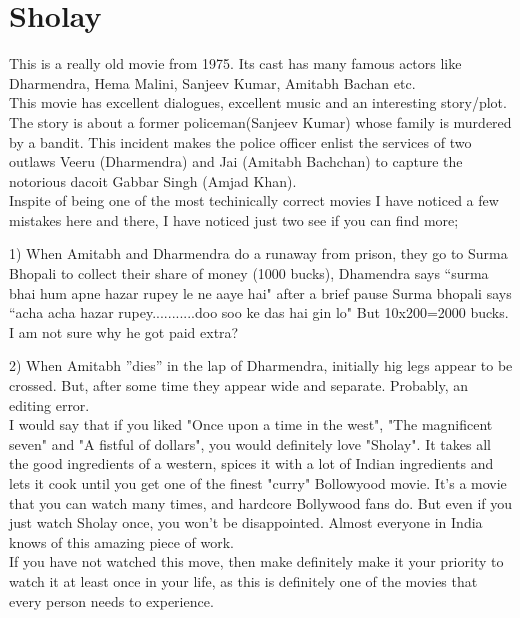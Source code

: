 \documentclass{article}
\author{Varun Khare, GSSS Rao}
\date{March 2017 }
\begin{document}
\maketitle
\section{Sholay}
This is a really old movie from 1975. Its cast has many famous actors like Dharmendra, Hema Malini, Sanjeev Kumar, Amitabh Bachan etc.
\\
This movie has excellent dialogues, excellent music and an interesting story/plot. The story is about a former policeman(Sanjeev Kumar) whose family is murdered by a bandit. This incident makes the police officer enlist the services of two outlaws Veeru (Dharmendra) and Jai (Amitabh Bachchan) to capture the notorious dacoit Gabbar Singh (Amjad Khan).
\\
Inspite of being one of the most techinically correct movies I have noticed a few mistakes here and there, I have noticed just two see if you can find more;

1) When Amitabh and Dharmendra do a runaway from prison, they go to Surma Bhopali to collect their share of money (1000 bucks), Dhamendra says ``surma bhai hum apne hazar rupey le ne aaye hai" after a brief pause Surma bhopali says ``acha acha hazar rupey...........doo soo ke das hai gin lo" But 10x200=2000 bucks. I am not sure why he got paid extra?

2) When Amitabh ''dies'' in the lap of Dharmendra, initially hig legs appear to be crossed. But, after some time they appear wide and separate. Probably, an editing error.
\\
I would say that if you liked "Once upon a time in the west", "The magnificent seven" and "A fistful of dollars", you would definitely love "Sholay". It takes all the good ingredients of a western, spices it with a lot of Indian ingredients and lets it cook until you get one of the finest "curry" Bollowyood movie. 
It's a movie that you can watch many times, and hardcore Bollywood fans do. But even if you just watch Sholay once, you won't be disappointed. Almost everyone in India knows of this amazing piece of work. 
\\
If you have not watched this move, then make definitely make it your priority to watch it at least once in your life, as this is definitely one of the movies that every person needs to experience.
\end{document}

